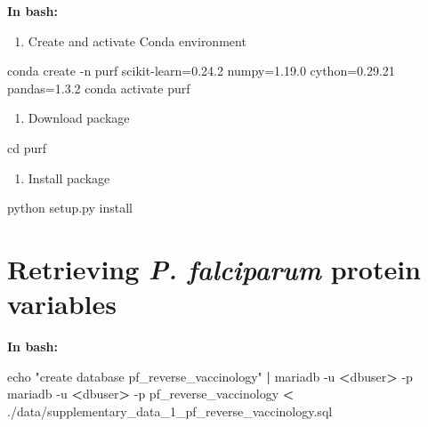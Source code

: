 \documentclass[
  11pt,
  oneside]{book}
\newenvironment{Shaded}{\begin{snugshade}}{\end{snugshade}}
\newcommand{\AttributeTok}[1]{\textcolor[rgb]{0.77,0.63,0.00}{#1}}
\newcommand{\BuiltInTok}[1]{#1}
\newcommand{\ExtensionTok}[1]{#1}
\newcommand{\KeywordTok}[1]{\textcolor[rgb]{0.13,0.29,0.53}{\textbf{#1}}}
\newcommand{\NormalTok}[1]{#1}
\newcommand{\OperatorTok}[1]{\textcolor[rgb]{0.81,0.36,0.00}{\textbf{#1}}}
\newcommand{\StringTok}[1]{\textcolor[rgb]{0.31,0.60,0.02}{#1}}
\providecommand{\tightlist}{%
  \setlength{\itemsep}{0pt}\setlength{\parskip}{0pt}}
\begin{document}
\textbf{In bash: }

\begin{enumerate}
\def\labelenumi{\arabic{enumi}.}
\tightlist
\item
  Create and activate Conda environment
\end{enumerate}

\begin{Shaded}
\begin{Highlighting}[]
\ExtensionTok{conda}\NormalTok{ create }\AttributeTok{{-}n}\NormalTok{ purf scikit{-}learn=0.24.2 numpy=1.19.0 cython=0.29.21 pandas=1.3.2}
\ExtensionTok{conda}\NormalTok{ activate purf}
\end{Highlighting}
\end{Shaded}

\begin{enumerate}
\def\labelenumi{\arabic{enumi}.}
\setcounter{enumi}{1}
\tightlist
\item
  Download package
\end{enumerate}

\begin{Shaded}
\begin{Highlighting}[]
\BuiltInTok{cd}\NormalTok{ purf}
\end{Highlighting}
\end{Shaded}

\begin{enumerate}
\def\labelenumi{\arabic{enumi}.}
\setcounter{enumi}{2}
\tightlist
\item
  Install package
\end{enumerate}

\begin{Shaded}
\begin{Highlighting}[]
\ExtensionTok{python}\NormalTok{ setup.py install}
\end{Highlighting}
\end{Shaded}

\hypertarget{retrieving-p.-falciparum-protein-variables}{%
\section{\texorpdfstring{Retrieving \emph{P. falciparum} protein variables}{Retrieving P. falciparum protein variables}}\label{retrieving-p.-falciparum-protein-variables}}

\textbf{In bash: }

\begin{Shaded}
\begin{Highlighting}[]
\BuiltInTok{echo} \StringTok{"create database pf\_reverse\_vaccinology"} \KeywordTok{|} \ExtensionTok{mariadb} \AttributeTok{{-}u} \OperatorTok{\textless{}}\NormalTok{dbuser}\OperatorTok{\textgreater{}}\NormalTok{ {-}p}
\ExtensionTok{mariadb} \AttributeTok{{-}u} \OperatorTok{\textless{}}\NormalTok{dbuser}\OperatorTok{\textgreater{}}\NormalTok{ {-}p pf\_reverse\_vaccinology }\OperatorTok{\textless{}}\NormalTok{ ./data/supplementary\_data\_1\_pf\_reverse\_vaccinology.sql}
\end{Highlighting}
\end{Shaded}
\end{document}
